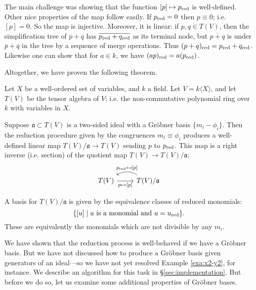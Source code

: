The main challenge was showing that the function $[p] \mapsto p_{\mathrm{red}}$ is well-defined. Other nice properties of the map follow easily. If $p_{\mathrm{red}} = 0$ then $p \equiv 0$; i.e. $[p]=0$. So the map is injective. Moreover, it is linear: if $p,q\in T(V)$, then the simplification tree of $\overline{p} + \overline{q}$ has $\overline{p_{\mathrm{red}}+q_{\mathrm{red}}}$ as its terminal node, but $\overline{p+q}$ is under $\overline{p} + \overline{q}$ in the tree by a sequence of merge operations. Thus $(p+q)_{\mathrm{red}} = p_{\mathrm{red}} + q_{\mathrm{red}}$. Likewise one can show that for $a \in k$, we have $(ap)_{\mathrm{red}} = a(p_{\mathrm{red}})$.

Altogether, we have proven the following theorem.
\begin{thm}\label{thm:grobner-thm}
	Let $X$ be a well-ordered set of variables, and $k$ a field. Let $V = k\langle X \rangle$, and let $T(V)$ be the tensor algebra of $V$; i.e. the non-commutative polynomial ring over $k$ with variables in $X$.
	
	Suppose $\mathfrak{a} \subset T(V)$ is a two-sided ideal with a Gr\"obner basis $\{m_i - \phi_i\}$. Then the reduction procedure given by the congruences $m_i \equiv \phi_i$ produces a well-defined linear map $T(V)/\mathfrak{a} \to T(V)$ sending $p$ to $p_{\mathrm{red}}$. This map is a right inverse (i.e. section) of the quotient map $T(V) \to T(V)/\mathfrak{a}$:
	\[\begin{tikzcd}
	T(V) \arrow[r, "p \mapsto {[p]}",swap] & \arrow[l,bend right, swap," p_\red \mapsfrom {[p]}"] T(V)/\mathfrak{a}
	\end{tikzcd}\]
\end{thm}
\begin{cor}\label{cor:grobner}
	A basis for $T(V)/\mathfrak{a}$ is given by the equivalence classes of reduced monomials:
	\[
		\{[u] \mid u \textnormal{ is a monomial and }u = u_{\mathrm{red}}\}.
	\]
	These are equivalently the monomials which are not divisible by any $m_i$.
\end{cor}
We have shown that the reduction process is well-behaved if we have a Gr\"obner basis. But we have not discussed how to produce a Gr\"obner basis given generators of an ideal---so we have not yet resolved Example \ref{exa:x2-y2}, for instance. We describe an algorithm for this task in \S\ref{sec:implementation}. But before we do so, let us examine some additional properties of Gr\"obner bases.

